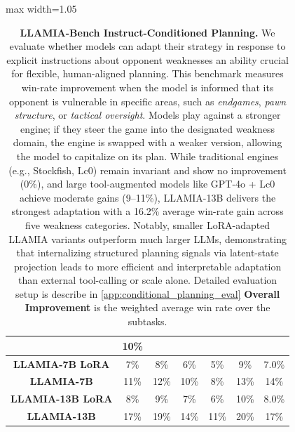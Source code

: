 \documentclass{article}
\newcommand{\valbest}[1]{\colorbox{valbest}{#1}}
\newcommand{\valgood}[1]{\colorbox{valgood}{#1}}
\theoremstyle{plain}
\theoremstyle{definition}
\theoremstyle{remark}
\begin{document}
\begin{table}[h]
\begin{adjustbox}{max width=1.05\textwidth}
\begin{tabular}{c|ccccc|c}
        & 10\% \\
    \midrule
        \textbf{LLAMIA-7B LoRA} 
        & 7\% & 8\% & 6\% & 5\% & 9\% 
        & 7.0\% \\
        \textbf{LLAMIA-7B} 
        & 11\% & \valgood{12\%} & 10\% & \valgood{8\%} & \valgood{13\%} 
        & \valgood{14\%} \\
        \textbf{LLAMIA-13B LoRA} 
        & 8\% & 9\% & 7\% & 6\% & 10\% 
        & 8.0\% \\
        \textbf{LLAMIA-13B} 
        & \valbest{17\%} & \valbest{19\%} & \valbest{14\%} & \valbest{11\%} & \valbest{20\%} 
        & \valbest{17\%} \\
    \bottomrule[1.2pt]
    \end{tabular}
    \end{adjustbox}
    \caption{
\textbf{LLAMIA-Bench Instruct-Conditioned Planning.}  
We evaluate whether models can adapt their strategy in response to explicit instructions about opponent weaknesses an ability crucial for flexible, human-aligned planning. This benchmark measures win-rate improvement when the model is informed that its opponent is vulnerable in specific areas, such as \emph{endgames}, \emph{pawn structure}, or \emph{tactical oversight}. Models play against a stronger engine; if they steer the game into the designated weakness domain, the engine is swapped with a weaker version, allowing the model to capitalize on its plan. While traditional engines (e.g., Stockfish, Lc0) remain invariant and show no improvement (0\%), and large tool-augmented models like GPT-4o + Lc0 achieve moderate gains (9–11\%), LLAMIA-13B delivers the strongest adaptation with a 16.2\% average win-rate gain across five weakness categories. Notably, smaller LoRA-adapted LLAMIA variants outperform much larger LLMs, demonstrating that internalizing structured planning signals via latent-state projection leads to more efficient and interpretable adaptation than external tool-calling or scale alone. Detailed evaluation setup is describe in \cref{app:conditional_planning_eval} \textbf{Overall Improvement} is the weighted average win rate over the subtasks. 
}

    \label{tab:instruct_conditioned_planning}
\end{table}



\end{document}
